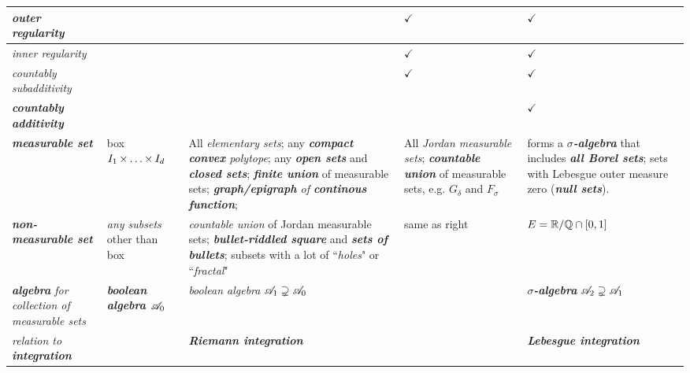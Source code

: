 \documentclass[11pt]{article}
\begin{document}
\begin{table}[h!]
\begin{tabularx}{1\textwidth} { 
  | >{\raggedright\arraybackslash} m{3cm}
  | >{\centering\arraybackslash}X
  | >{\centering\arraybackslash}X
  | >{\centering\arraybackslash}X
  | >{\centering\arraybackslash}X  | }
\hline \vspace{5pt}
\emph{outer regularity}  \vspace{2pt}  & &  &   $\checkmark$ & $\checkmark$ \\
\hline \vspace{5pt}
\emph{inner regularity}  \vspace{2pt}  & &  &  $\checkmark$  & $\checkmark$ \\
\hline \vspace{5pt}
\emph{countably subadditivity}  \vspace{2pt}  & &  & $\checkmark$  & $\checkmark$ \\
\hline \vspace{5pt}
\textbf{\emph{countably additivity}}  \vspace{2pt}  & &  &  & $\checkmark$ \\
\hline \vspace{5pt}
\textbf{\emph{measurable set}}  \vspace{2pt}  & box $I_1 \,{\times}\ldots{\times}\, I_d$ & All \emph{elementary sets}; any \emph{\textbf{compact convex }polytope}; any \emph{\textbf{open sets}} and \emph{\textbf{closed sets}}; \emph{\textbf{finite union}} of measurable sets; \emph{\textbf{graph/epigraph} of \textbf{continous function}}; & All \emph{Jordan measurable sets}; \emph{\textbf{countable union}} of measurable sets, e.g. $G_{\delta}$ and $F_{\sigma}$  & forms a \emph{\textbf{$\sigma$-algebra}} that includes \emph{\textbf{all Borel sets}}; sets with Lebesgue outer measure zero (\emph{\textbf{null sets}}). \\
\hline \vspace{5pt}
\textbf{\emph{non-measurable set}}  \vspace{2pt}  & \emph{any subsets} other than box & \emph{countable union} of Jordan measurable sets; \emph{\textbf{bullet-riddled square}} and \emph{\textbf{sets of bullets}}; subsets with a lot of ``\emph{holes}" or ``\emph{fractal}" & same as right & $E = {\mathbb R}/{\mathbb Q} \cap [0,1]$ \\
\hline \vspace{5pt}
\emph{\textbf{algebra} for collection of measurable sets}  \vspace{2pt}  & \emph{\textbf{boolean algebra ${\mathscr A}_0$}} & \emph{boolean algebra} ${\mathscr A}_1 \supsetneq {\mathscr A}_0$ &   & \emph{\textbf{$\sigma$-algebra}} ${\mathscr A}_{2} \supsetneq {\mathscr A}_1$ \\
\hline \vspace{5pt}
\emph{relation to \textbf{integration}}  \vspace{2pt}  & & \emph{\textbf{Riemann integration}}  &  & \emph{\textbf{Lebesgue integration}} \\
\hline
\end{tabularx}
\end{table}
\end{document}
